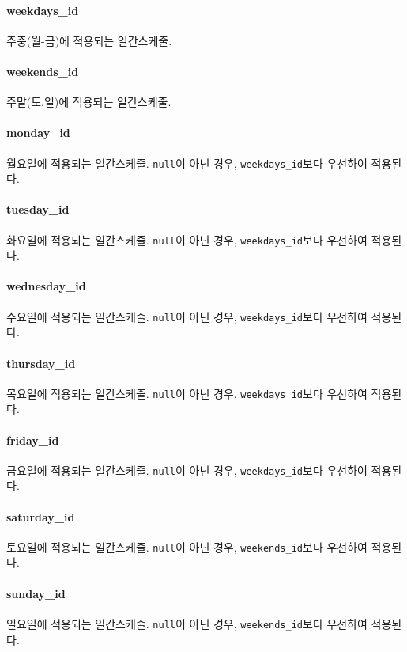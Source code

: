 \paragraph{weekdays\_id} 주중(월-금)에 적용되는 일간스케줄.

\paragraph{weekends\_id} 주말(토,일)에 적용되는 일간스케줄.

\paragraph{monday\_id} 월요일에 적용되는 일간스케줄. \texttt{null}이 아닌 경우, \texttt{weekdays\_id}보다 우선하여 적용된다.

\paragraph{tuesday\_id} 화요일에 적용되는 일간스케줄. \texttt{null}이 아닌 경우, \texttt{weekdays\_id}보다 우선하여 적용된다.

\paragraph{wednesday\_id} 수요일에 적용되는 일간스케줄. \texttt{null}이 아닌 경우, \texttt{weekdays\_id}보다 우선하여 적용된다.

\paragraph{thursday\_id} 목요일에 적용되는 일간스케줄. \texttt{null}이 아닌 경우, \texttt{weekdays\_id}보다 우선하여 적용된다.

\paragraph{friday\_id} 금요일에 적용되는 일간스케줄. \texttt{null}이 아닌 경우, \texttt{weekdays\_id}보다 우선하여 적용된다.

\paragraph{saturday\_id} 토요일에 적용되는 일간스케줄. \texttt{null}이 아닌 경우, \texttt{weekends\_id}보다 우선하여 적용된다.

\paragraph{sunday\_id} 일요일에 적용되는 일간스케줄. \texttt{null}이 아닌 경우, \texttt{weekends\_id}보다 우선하여 적용된다.

